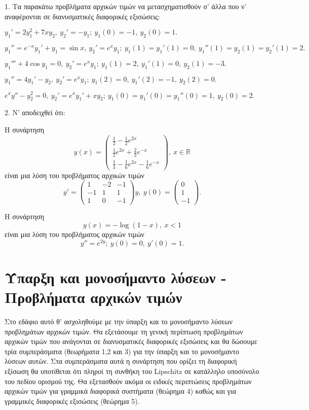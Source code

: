 \documentclass[11pt,a4paper,twoside]{book}
\begin{document}
1.  Τα παρακάτω προβλήματα αρχικών τιμών να μετασχηματισθούν σ' άλλα που ν' αναφέρονται σε διανυσματικές διαφορικές εξισώσεις:
\begin{rlist}
\item $y_1' = 2y_1^2+7xy_2, \ y_2'=-y_1; \ y_1(0)=-1, \ y_2(0)=1.$
\item $y_1'' = e^{-x}y_1'+y_1 = \sin x, \ y_2' = e^x y_1; \ y_1(1)=y_1'(1)=0, \ y_1''(1)=y_2(1)=y_2'(1)=2.$
\item $y_1''' + 4\cos y_1 = 0, \ y_2' = e^x y_1; \ y_1(1)=2, \ y_1'(1)=0, \ y_2(1)=-3.$
\item $y_1'' = 4y_1' - y_2, \ y_2' = e^x y_1; \ y_1(2)=0, \ y_1'(2)=-1, \ y_2(2)=0.$
\item $e^x y'' - y_2^2 = 0, \ y_2' = e^x y_1' + xy_2; \ y_1(0)=y_1'(0)=y_1''(0)=1, \ y_2(0)=2.$
\end{rlist}

2. Ν' αποδειχθεί ότι:
\begin{rlist}
\item Η συνάρτηση
\[
y(x) = \begin{pmatrix} \frac{1}{2} - \frac{1}{2}e^{2x} \\ \frac{1}{2}e^{2x} + \frac{2}{3}e^{-x} \\ \frac{1}{3} - \frac{1}{6}e^{2x} - \frac{1}{6}e^{-x} \end{pmatrix}, \ x \in \mathbb{R}
\]
είναι μια λύση του προβλήματος αρχικών τιμών
\[
y' = \begin{pmatrix} 1 & -2 & -1 \\ -1 & 1 & 1 \\ 1 & 0 & -1 \end{pmatrix}y, \ y(0) = \begin{pmatrix} 0 \\ 1 \\ -1 \end{pmatrix}.
\]
\item Η συνάρτηση
\[
y(x) = -\log(1-x), \ x<1
\]
είναι μια λύση του προβλήματος αρχικών τιμών
\[
y''=e^{2y}; \ y(0)=0, \ y'(0)=1.
\]
\end{rlist}

\section{Ύπαρξη και μονοσήμαντο λύσεων - Προβλήματα αρχικών τιμών}
Στο εδάφιο αυτό θ' ασχοληθούμε με την ύπαρξη και το μονοσήμαντο λύσεων προβλημάτων αρχικών τιμών. Θα εξετάσουμε τη γενική περίπτωση προβλημάτων αρχικών τιμών που ανάγονται σε διανυσματικές διαφορικές εξισώσεις και θα δώσουμε τρία συμπεράσματα (θεωρήματα 1,2 και 3) για την ύπαρξη και το μονοσήμαντο λύσεων αυτών. Στα συμπεράσματα αυτά η συνάρτηση που ορίζει τη διαφορική εξίσωση θα υποτίθεται ότι πληροί τη συνθήκη του Lipschitz σε κατάλληλο υποσύνολο του πεδίου ορισμού της. Θα εξετασθούν ακόμα οι ειδικές περιπτώσεις προβλημάτων αρχικών τιμών για γραμμικά διαφορικά συστήματα (θεώρημα 4) καθώς και για γραμμικές διαφορικές εξισώσεις (θεώρημα 5).
\end{document}
